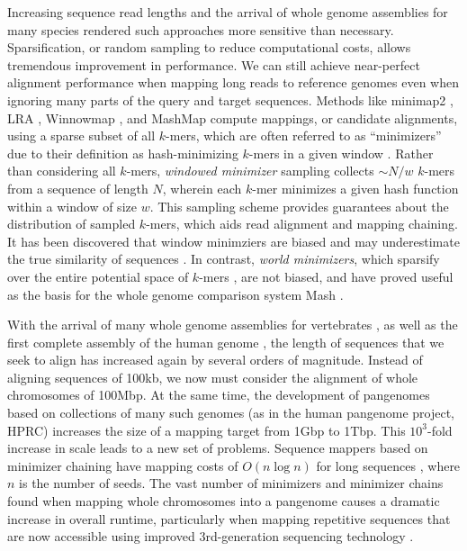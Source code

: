\documentclass{bioinfo}
\theoremstyle{definition}
\begin{document}
Increasing sequence read lengths and the arrival of whole genome assemblies for many species rendered such approaches more sensitive than necessary.
Sparsification, or random sampling to reduce computational costs, allows tremendous improvement in performance.
We can still achieve near-perfect alignment performance when mapping long reads to reference genomes even when ignoring many parts of the query and target sequences.
Methods like minimap2 \citep{Li_2018}, LRA \citep{Ren_2021}, Winnowmap \citep{Jain_2020}, and MashMap \citep{Jain_2018} compute mappings, or candidate alignments, using a sparse subset of all $k$-mers, which are often referred to as ``minimizers'' due to their definition as hash-minimizing $k$-mers in a given window \cite{Roberts_2004}.
Rather than considering all $k$-mers, \textit{windowed minimizer} sampling collects $\sim N/w$ $k$-mers from a sequence of length $N$, wherein each $k$-mer minimizes a given hash function within a window of size $w$.
This sampling scheme provides guarantees about the distribution of sampled $k$-mers, which aids read alignment and mapping chaining.
It has been discovered that window minimziers are biased and may underestimate the true similarity of sequences \citep{Belbasi_2022}.
In contrast, \textit{world minimizers}, which sparsify over the entire potential space of $k$-mers \citep{Broder_1997}, are not biased, and have proved useful as the basis for the whole genome comparison system Mash \citep{Ondov_2016}.

With the arrival of many whole genome assemblies for vertebrates \citep{Rhie_2021}, as well as the first complete assembly of the human genome \cite{Nurk_2022}, the length of sequences that we seek to align has increased again by several orders of magnitude.
Instead of aligning sequences of 100kb, we now must consider the alignment of whole chromosomes of 100Mbp.
At the same time, the development of pangenomes based on collections of many such genomes (as in the human pangenome project, HPRC) increases the size of a mapping target from 1Gbp to 1Tbp.
This $10^3$-fold increase in scale leads to a new set of problems. %
Sequence mappers based on minimizer chaining have mapping costs of $O(n \log n)$ for long sequences \citep{Jain_2022}, where $n$ is the number of seeds.
The vast number of minimizers and minimizer chains found when mapping whole chromosomes into a pangenome causes a dramatic increase in overall runtime, particularly when mapping repetitive sequences that are now accessible using improved 3rd-generation sequencing technology \citep{Logsdon_2021,Nurk_2022}.
\end{document}
